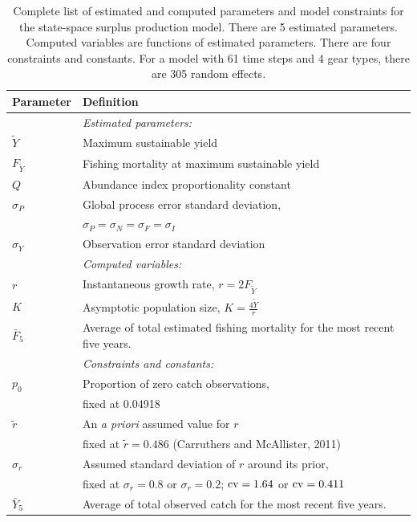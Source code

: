 \documentclass[12pt,letterpaper]{article}
\newcommand\MSY{\widetilde{Y}}
\newcommand\Fmsy{F_{\MSY}}
\begin{document}
\begin{table}
\caption{Complete list of estimated and computed parameters and model
constraints for the state-space surplus production model. 
There are 5 estimated parameters. 
Computed variables are functions of estimated parameters.
There are four constraints and constants.
For a model with 61 time steps and 4 gear types, there are 305 random effects.
}
\label{tab:allvars1}
\begin{center}
\begin{tabular}{ll}
\hline
Parameter & Definition\\
\hline
\hline
       & {\it Estimated parameters:}\\
$\MSY$ & Maximum sustainable yield\\
$\Fmsy$& Fishing mortality at maximum sustainable yield\\
$Q$    & Abundance index proportionality constant\\
$\sigma_P$ & Global process error standard deviation,\\
           & $\sigma_P=\sigma_N=\sigma_F=\sigma_I$\\
$\sigma_Y$ & Observation error standard deviation \\
\hline
       & {\it Computed variables:}\\
$r$    & Instantaneous growth rate, $r=2F_{\MSY}$\\
$K$    & Asymptotic population size, $K=\frac{4\MSY}{r}$\\
$\bar{F}_5$ & Average of total estimated fishing mortality for the most recent
five years.\\
\hline
       & {\it Constraints and constants:}\\
$p_0$  & Proportion of zero catch observations,\\
       & fixed at 0.04918\\
$\tilde{r}$ & An {\it a priori} assumed value for $r$\\
            & fixed at $\tilde{r}=0.486$ (Carruthers and McAllister, 2011)\\
$\sigma_r$  & Assumed standard deviation of $r$ around its prior,\\
            & fixed at $\sigma_r=0.8$ or $\sigma_r=0.2$;
            ${\rm cv}=1.64$ or ${\rm cv}=0.411$\\
$\bar{Y}_5$ & Average of total observed catch for the most recent
five years.\\
\hline
\end{tabular}
\end{center}
\end{table}
\end{document}

